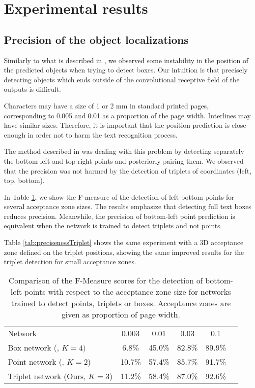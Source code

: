 \documentclass[conference]{IEEEtran}
\begin{document}
\section{Experimental results}
\label{sec:results}
\subsection{Precision of the object localizations}
Similarly to what is described in \cite{moysset2016points}, we observed some instability in the position of the predicted objects when trying to detect boxes. Our intuition is that precisely detecting objects which ends outside of the convolutional receptive field of the outputs is difficult.

Characters may have a size of 1 or 2 mm in standard printed pages, corresponding to 0.005 and 0.01 as a proportion of the page width. Interlines may have similar sizes. Therefore, it is important that the position prediction is close enough in order not to harm the text recognition process.

The method described in \cite{moysset2016points} was dealing with this problem by detecting separately the bottom-left and top-right points and posteriorly pairing them. We observed that the precision was not harmed by the detection of triplets of coordinates (left, top, bottom).

In Table \ref{tab:precisenessPoint}, we show the F-measure of the detection of left-bottom points for several acceptance zone sizes. The results emphasize that detecting full text boxes reduces precision. Meanwhile, the precision of bottom-left point prediction is equivalent when the network is trained to detect triplets and not points.

Table \ref{tab:precisenessTriplet} shows the same experiment with a 3D acceptance zone defined on the triplet positions, showing the same improved results for the triplet detection for small acceptance zones.



\begin{table}
\begin{center}
\caption{Comparison of the F-Measure scores for the detection of bottom-left points with respect to the acceptance zone size for networks trained to detect points, triplets or boxes. Acceptance zones are given as proportion of page width.}
\label{tab:precisenessPoint}
\begin{tabular}{lccccc}
Network & 0.003 & 0.01  & 0.03 &  0.1  \\ %
\arrayrulecolor{cwblue1} \toprule
Box network (\cite{moysset2016learning}, $K{=}4)$ & 6.8\% & 45.0\% & 82.8\% & 89.9\% \\ %
Point network (\cite{moysset2016points}, $K{=}2$) & 10.7\% & 57.4\% & 85.7\% & 91.7\% \\ %
Triplet network (Ours, $K{=}3$) & 11.2\% & 58.4\% & 87.0\% & 92.6\% \\ %
\end{tabular}
\end{center}
\end{table}
\end{document}
